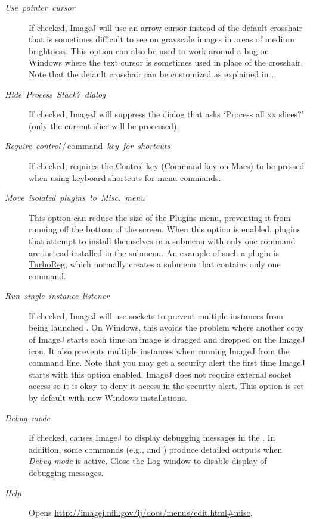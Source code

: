\begin{description}
\item [{\emph{Use\ pointer\ cursor}}] If checked, ImageJ will use an
arrow cursor instead of the default crosshair that is sometimes difficult
to see on grayscale images in areas of medium brightness. This option
can also be used to work around a bug on Windows where the text cursor
is sometimes used in place of the crosshair. Note
that the default crosshair can be customized as explained in .
\item [{\emph{Hide}\ \emph{\textquotedbl{}Process}\ \emph{Stack?\textquotedbl{}}\ \emph{dialog}}] If
checked, ImageJ will suppress the dialog that asks `Process all xx
slices?' (only the current slice will be processed).
\item [{\emph{Require}\ \emph{control}\,/\,command\ \emph{key}\ \emph{for}\ \emph{shortcuts}}] If
checked, requires the Control key (Command key on Macs) to be pressed
when using keyboard shortcuts for menu commands.
\item [{\emph{Move\ isolated\ plugins\ to\ Misc.\ menu}}] This option
can reduce the size of the Plugins menu, preventing it from running
off the bottom of the screen. When this option is enabled, plugins
that attempt to install themselves in a submenu with only one command
are instead installed in the 
submenu. An example of such a plugin is \href{http://bigwww.epfl.ch/thevenaz/turboreg/}{TurboReg},
which normally creates a 
submenu that contains only one command.
\item [{\emph{Run}\ \emph{single}\ \emph{instance}\ \emph{listener}}] \improvement{}If
checked, ImageJ will use sockets to prevent multiple instances from
being launched \cite{C-SocketListener}. On Windows, this avoids the
problem where another copy of ImageJ starts each time an image is
dragged and dropped on the ImageJ icon. It also prevents multiple
instances when running ImageJ from the command line. Note that you
may get a security alert the first time ImageJ starts with this option
enabled. ImageJ does not require external socket access so it is okay
to deny it access in the security alert. This option is set by default
with new Windows installations.
\item [{\emph{Debug\ mode}}] If checked, causes ImageJ to display debugging
messages in the . In addition, some commands
(e.g., 
and ) produce detailed outputs
when \emph{Debug mode} is active. Close the Log window to disable
display of debugging messages.
\item [{\emph{Help}}] Opens \url{http://imagej.nih.gov/ij/docs/menus/edit.html#misc}.
\end{description}

